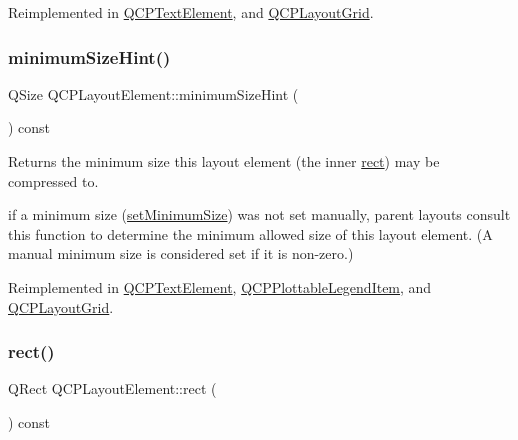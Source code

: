 Reimplemented in \hyperlink{class_q_c_p_text_element_a65e5f4c5a852bbff48acef236048354f}{Q\+C\+P\+Text\+Element}, and \hyperlink{class_q_c_p_layout_grid_acb285925df25b54b3db25c7b1804d230}{Q\+C\+P\+Layout\+Grid}.

\mbox{\label{class_q_c_p_layout_element_ab3fdb5c9a5189bb2dac10d4d25329cd8}} 
\subsubsection{\texorpdfstring{minimum\+Size\+Hint()}{minimumSizeHint()}}
{\footnotesize\ttfamily Q\+Size Q\+C\+P\+Layout\+Element\+::minimum\+Size\+Hint (\begin{DoxyParamCaption}{ }\end{DoxyParamCaption}) const\hspace{0.3cm}{\ttfamily [virtual]}}

Returns the minimum size this layout element (the inner \hyperlink{class_q_c_p_layout_element_a208effccfe2cca4a0eaf9393e60f2dd4}{rect}) may be compressed to.

if a minimum size (\hyperlink{class_q_c_p_layout_element_a5dd29a3c8bc88440c97c06b67be7886b}{set\+Minimum\+Size}) was not set manually, parent layouts consult this function to determine the minimum allowed size of this layout element. (A manual minimum size is considered set if it is non-\/zero.) 

Reimplemented in \hyperlink{class_q_c_p_text_element_a5b6e94c79d0cd56c13cbedbb7021ea08}{Q\+C\+P\+Text\+Element}, \hyperlink{class_q_c_p_plottable_legend_item_a923b8b0e2b888cbb00abae0783edf509}{Q\+C\+P\+Plottable\+Legend\+Item}, and \hyperlink{class_q_c_p_layout_grid_a361c3f5906c21a6709cb8daf5a9e019f}{Q\+C\+P\+Layout\+Grid}.

\mbox{\label{class_q_c_p_layout_element_a208effccfe2cca4a0eaf9393e60f2dd4}} 
\subsubsection{\texorpdfstring{rect()}{rect()}}
{\footnotesize\ttfamily Q\+Rect Q\+C\+P\+Layout\+Element\+::rect (\begin{DoxyParamCaption}{ }\end{DoxyParamCaption}) const\hspace{0.3cm}{\ttfamily [inline]}}

